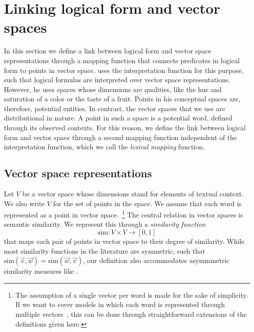 \newcommand{\loglang}{\ensuremath{{\cal{L}}}\xspace}
\newcommand{\predsym}[1]{\ensuremath{{\cal{P}}_{#1}}\xspace}
\newcommand{\simfunc}{\ensuremath{\mathrm{sim}}}

\section{Linking logical form and vector spaces}
\label{sec:interface}

In this section we define a link between logical form and vector space
representations through a mapping function that connects predicates in
logical form to points in vector space. \citet{Gardenfors:04} uses the
interpretation function for this purpose, such that 
logical formulas are interpreted over vector space
representations. However, he uses spaces whose dimensions are
qualities, like the hue and saturation of a color or the taste of a
fruit. Points in his conceptual spaces are, therefore, potential
entities. In contrast, the vector spaces that we use are
distributional in nature. A point in such a space is a potential word,
defined through its observed contexts. For this reason, we define the link between logical form
and vector space through a second mapping function independent of the
interpretation function, which we call the \emph{lexical mapping}
function. 

\subsection*{Vector space representations} 


Let $V$ be a vector space whose dimensions stand for elements of  textual
context. We also write $V$ for the set of points in the space. We assume that each word is represented as a point in vector
space.~\footnote{The assumption of a single vector per word is made
  for the sake of simplicity. If we want to cover models in which each word is
  represented through multiple
  vectors~\citep{ReisingerMooney:10,dinu-lapata:2010:EMNLP}, this can
  be done through straightforward extensions of the definitions given here.} The central relation in vector spaces is semantic
similarity. We represent this through a \textit{similarity function} \[\simfunc: V
\times V \to [0,1] \] that maps each pair of points in vector space to their
degree of similarity. While most similarity functions in the
literature are symmetric, such that  $\simfunc(\vec v, \vec w) = \simfunc(\vec w,
\vec v)$, our definition also accommodates asymmmetric similarity
measures like \citet{kotlerman:nlej2010}. 

